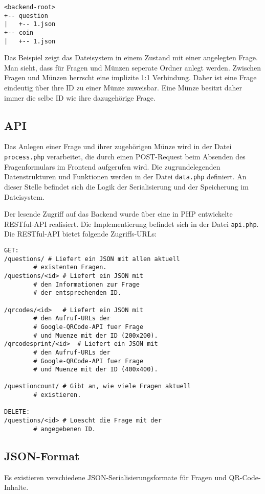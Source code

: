 \begin{verbatim}
<backend-root>
+-- question
|   +-- 1.json
+-- coin
|   +-- 1.json
\end{verbatim}

Das Beispiel zeigt das Dateisystem in einem Zustand mit einer angelegten Frage. Man sieht, dass für Fragen und Münzen seperate Ordner anlegt werden. Zwischen Fragen und Münzen herrscht eine implizite 1:1 Verbindung. Daher ist eine Frage eindeutig über ihre ID zu einer Münze zuweisbar. Eine Münze besitzt daher immer die selbe ID wie ihre dazugehörige Frage.

\subsection{API}
\label{subs:API}
Das Anlegen einer Frage und ihrer zugehörigen Münze wird in der Datei \texttt{process.php} verarbeitet, die durch einen POST-Request beim Absenden des Fragenformulars im Frontend aufgerufen wird. Die zugrundelegenden Datenstrukturen und Funktionen werden in der Datei \texttt{data.php} definiert. An dieser Stelle befindet sich die Logik der Serialisierung und der Speicherung im Dateisystem.

Der lesende Zugriff auf das Backend wurde über eine in PHP entwickelte RESTful-API realisiert. Die Implementierung befindet sich in der Datei \texttt{api.php}.
Die RESTful-API bietet folgende Zugriffs-URLs:

 \begin{lstlisting}
GET:
/questions/	# Liefert ein JSON mit allen aktuell
		# existenten Fragen.
/questions/<id>	# Liefert ein JSON mit
		# den Informationen zur Frage
		# der entsprechenden ID.

/qrcodes/<id>	# Liefert ein JSON mit
		# den Aufruf-URLs der
		# Google-QRCode-API fuer Frage
		# und Muenze mit der ID (200x200).
/qrcodesprint/<id>	# Liefert ein JSON mit
		# den Aufruf-URLs der
		# Google-QRCode-API fuer Frage
		# und Muenze mit der ID (400x400).

/questioncount/	# Gibt an, wie viele Fragen aktuell
		# existieren.

DELETE:
/questions/<id>	# Loescht die Frage mit der
		# angegebenen ID.
\end{lstlisting}

\subsection{JSON-Format}
\label{sub:JSON-Format}
Es existieren verschiedene JSON-Serialisierungsformate für Fragen und QR-Code-Inhalte.

